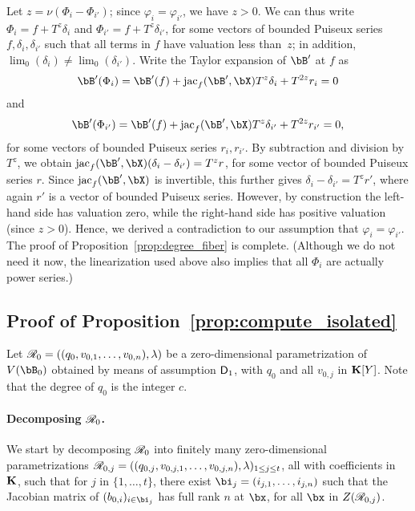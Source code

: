\documentclass[12pt]{article}
\begin{document}
Let $z=\nu(\Phi_i-\Phi_{i'})$; since  $\varphi_i = \varphi_{i'}$, we have
$z > 0$. We can thus write $\Phi_i=f + T^z
\delta_i$ and $\Phi_{i'}=f + T^z \delta_{i'}$, for some vectors of
bounded Puiseux series $f, \delta_i, \delta_{i'}$ such that all terms
in $f$ have valuation less than~$z$; in addition, $\lim_0(\delta_i)
\ne \lim_0(\delta_{i'})$. Write the Taylor expansion of $\bB'$ at $f$ as
$$\bB'(\Phi_i) = \bB'(f) + \jac_f(\bB',\bX) T^z \delta_i + T^{2z} r_i =0$$
and
$$\bB'(\Phi_{i'}) = \bB'(f) + \jac_f(\bB',\bX) T^z \delta_{i'} + T^{2z}
r_{i'} =0,$$ for some vectors of bounded Puiseux series $r_i,r_{i'}$.
By subtraction and division by $T^z$, we obtain $\jac_f(\bB',\bX)
(\delta_i-\delta_{i'}) = T^z r$, for some vector of bounded Puiseux
series $r$.  Since $\jac_f(\bB',\bX)$ is invertible, this further gives
$\delta_i-\delta_{i'} = T^z r'$, where again $r'$ is a vector of
bounded Puiseux series.  However, by construction the left-hand side
has valuation zero, while the right-hand side has positive valuation
(since $z > 0$). Hence, we derived a contradiction to our assumption
that $\varphi_i = \varphi_{i'}$. The proof of Proposition~\ref{prop:degree_fiber} is
complete. (Although we do not need it now, the linearization
used above also implies that all $\Phi_i$ are actually power series.)


\subsection{Proof of Proposition~\ref{prop:compute_isolated}} \label{proof:prop2}

Let $\mathscr{R}_0 =((q_{0},v_{0,1},\dots,v_{0,n}),\lambda)$ be a
zero-dimensional parametrization of $V(\bB_{0})$ obtained by means of
assumption $\mathsf{D}_1$, with $q_0$ and all $v_{0,j}$ in $\mathbf{K}[Y]$. Note
that the degree of $q_0$ is the integer $c$.

\paragraph{Decomposing $\mathscr{R}_0$.}
We start by decomposing $\mathscr{R}_0$ into finitely many zero-dimensional
parametrizations
$\mathscr{R}_{0,j}=((q_{0,j},v_{0,j,1},\dots,v_{0,j,n}),\lambda)_{1\le j\le
  t}$, all with coefficients in $\mathbf{K}$, such that for $j$ in
$\{1,\dots,t\}$, there exist $\bi_j=(i_{j,1},\dots,i_{j,n})$ such that
the Jacobian matrix of $(b_{0,i})_{i \in \bi_j}$ has full rank $n$ at
$\bx$, for all $\bx$ in $Z(\mathscr{R}_{0,j})$.
\end{document}

